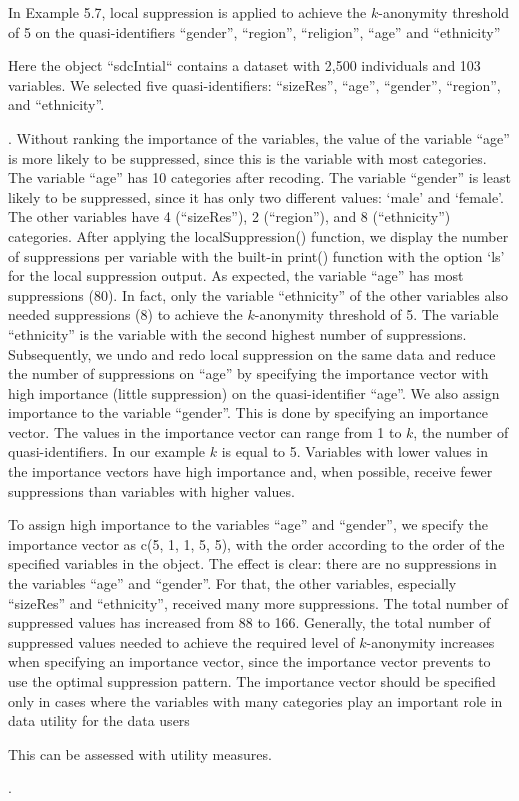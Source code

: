 \documentclass[letterpaper,10pt,english]{sphinxmanual}
\begin{document}
In Example 5.7, local suppression is applied to achieve the
\(k\)-anonymity threshold of 5 on the quasi-identifiers “gender”,
“region”, “religion”, “age” and “ethnicity” %
\begin{footnote}[6]\sphinxAtStartFootnote
Here the  object “sdcIntial“ contains a dataset with 2,500
individuals and 103 variables. We selected five quasi-identifiers:
“sizeRes”, “age”, “gender”, “region”, and “ethnicity”.
%
\end{footnote}.
Without ranking the importance of the variables, the value of the
variable “age” is more likely to be suppressed, since this is the
variable with most categories. The variable “age” has 10 categories
after recoding. The variable “gender” is least likely to be suppressed,
since it has only two different values: ‘male’ and ‘female’. The other
variables have 4 (“sizeRes”), 2 (“region”), and 8 (“ethnicity”)
categories. After applying the localSuppression() function, we display
the number of suppressions per variable with the built-in print()
function with the option ‘ls’ for the local suppression output. As
expected, the variable “age” has most suppressions (80). In fact, only
the variable “ethnicity” of the other variables also needed suppressions
(8) to achieve the \(k\)-anonymity threshold of 5. The variable
“ethnicity” is the variable with the second highest number of
suppressions. Subsequently, we undo and redo local suppression on the
same data and reduce the number of suppressions on “age” by specifying
the importance vector with high importance (little suppression) on the
quasi-identifier “age”. We also assign importance to the variable
“gender”. This is done by specifying an importance vector. The values in
the importance vector can range from 1 to \(k\), the number of
quasi-identifiers. In our example \(k\) is equal to 5. Variables
with lower values in the importance vectors have high importance and,
when possible, receive fewer suppressions than variables with higher
values.

To assign high importance to the variables “age” and “gender”, we
specify the importance vector as c(5, 1, 1, 5, 5), with the order
according to the order of the specified variables in the 
object. The effect is clear: there are no suppressions in the variables
“age” and “gender”. For that, the other variables, especially “sizeRes”
and “ethnicity”, received many more suppressions. The total number of
suppressed values has increased from 88 to 166.   Generally, the
total number of suppressed values needed to achieve the required level
of \(k\)-anonymity increases when specifying an importance vector,
since the importance vector prevents to use the optimal suppression
pattern. The importance vector should be specified only in cases where
the variables with many categories play an important role in data
utility for the data users %
\begin{footnote}[7]\sphinxAtStartFootnote
This can be assessed with utility measures.
%
\end{footnote}.
\end{document}
